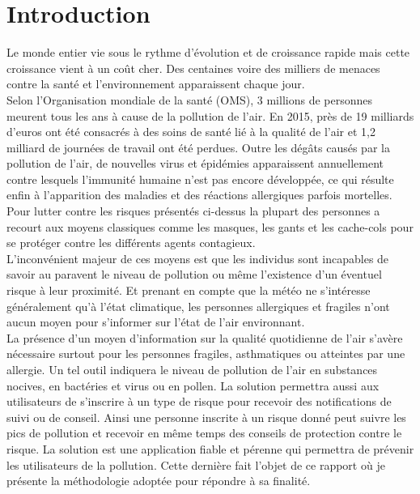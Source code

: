 \chapter*{Introduction}
\vspace*{1cm}
\qquad Le monde entier vie sous le rythme d'évolution et de croissance rapide mais cette croissance vient à un coût cher. Des centaines voire des milliers de menaces contre la santé et l'environnement apparaissent chaque jour.\\

Selon l’Organisation mondiale de la santé (OMS), 3 millions de personnes meurent tous les ans à cause de la pollution de l’air. En 2015, près de 19 milliards d’euros ont été consacrés à des soins de santé lié à la qualité de l’air et 1,2 milliard de journées de travail ont été perdues. Outre les dégâts causés par la pollution de l'air, de nouvelles virus et épidémies apparaissent annuellement contre lesquels l'immunité humaine n'est pas encore développée, ce qui résulte enfin à l'apparition des maladies et des réactions allergiques parfois mortelles.\\

Pour lutter contre les risques présentés ci-dessus la plupart des personnes a recourt aux moyens classiques comme les masques, les gants et les cache-cols pour se protéger contre les différents agents contagieux.\\

L'inconvénient majeur de ces moyens est que les individus sont incapables de savoir au paravent le niveau de pollution ou même l'existence d'un éventuel risque à leur proximité. Et prenant en compte que la météo ne s'intéresse généralement qu'à l'état climatique, les personnes allergiques et fragiles n'ont aucun moyen pour s'informer sur l'état de l'air environnant.\\

La présence d'un moyen d'information sur la qualité quotidienne de l'air s'avère nécessaire surtout pour les personnes fragiles, asthmatiques ou atteintes par une allergie. Un tel outil indiquera le niveau de pollution de l'air en substances nocives, en bactéries et virus ou en pollen. La solution permettra aussi aux utilisateurs de s'inscrire à un type de risque pour recevoir des notifications de suivi ou de conseil. Ainsi une personne inscrite à un risque donné peut suivre les pics de pollution et recevoir en même temps des conseils de protection contre le risque. La solution est une application fiable et pérenne
qui permettra de prévenir les utilisateurs de la pollution. Cette dernière fait l’objet de ce rapport où je présente la méthodologie adoptée pour répondre à sa finalité.\\

